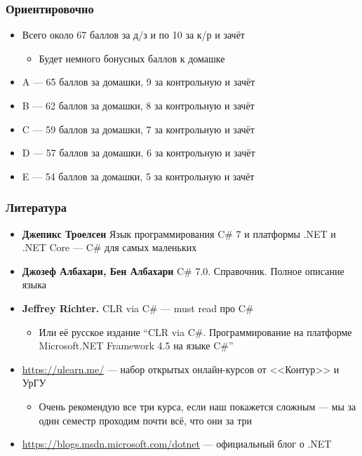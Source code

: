 \documentclass[xetex,mathserif,serif]{beamer}
\begin{document}
    \begin{frame}
        \frametitle{Ориентировочно}
        \begin{itemize}
            \item Всего около 67 баллов за д/з и по 10 за к/р и зачёт
            \begin{itemize}
                \item Будет немного бонусных баллов к домашке
            \end{itemize}
            \item A --- 65 баллов за домашки, 9 за контрольную и зачёт
            \item B --- 62 баллов за домашки, 8 за контрольную и зачёт
            \item C --- 59 баллов за домашки, 7 за контрольную и зачёт
            \item D --- 57 баллов за домашки, 6 за контрольную и зачёт
            \item E --- 54 баллов за домашки, 5 за контрольную и зачёт
        \end{itemize}
    \end{frame}

    \begin{frame}
    \frametitle{Литература}
        \begin{itemize}
            \item \textbf{Джепикс Троелсен} Язык программирования C\# 7 и платформы .NET и .NET Core --- C\# для самых маленьких
            \item \textbf{Джозеф Албахари, Бен Албахари} C\# 7.0. Справочник. Полное описание языка
            \item \textbf{Jeffrey Richter.} CLR via C\# --- must read про C\#
            \begin{itemize}
                \item Или её русское издание ``CLR via C\#. Программирование на платформе Microsoft.NET Framework 4.5 на языке C\#''
            \end{itemize}
            \item \url{https://ulearn.me/} --- набор открытых онлайн-курсов от <<Контур>> и УрГУ
            \begin{itemize}
                \item Очень рекомендую все три курса, если наш покажется сложным --- мы за один семестр проходим почти всё, что они за три
            \end{itemize}
            \item \url{https://blogs.msdn.microsoft.com/dotnet} --- официальный блог о .NET
        \end{itemize}
    \end{frame}
\end{document}
